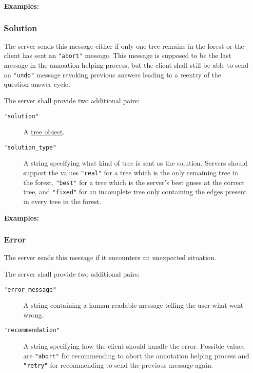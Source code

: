 \documentclass{scrartcl}
\newcommand{\jsstring}[1]{\texttt{\color{OrangeRed}"#1"}}
\newcommand{\Examples}{\noindent\textbf{Examples:}}
\begin{document}
\Examples



\subsubsection{Solution}
\label{ssub:Solution}

The server sends this message either if only one tree remains in the forest or the client has sent an \jsstring{abort} message.
This message is supposed to be the last message in the annoation helping process, but the client shall still be able to send an \jsstring{undo} message revoking previous answers leading to a reentry of the question-answer-cycle.

The server shall provide two additional pairs:
\begin{description}
    \item[\jsstring{solution}] A \hyperref[ssub:Tree object]{tree object}.
    \item[\jsstring{solution\_type}] A string specifying what kind of tree is sent as the solution.
        Servers should support the values \jsstring{real} for a tree which is the only remaining tree in the forest, \jsstring{best} for a tree which is the server’s best guess at the correct tree, and \jsstring{fixed} for an incomplete tree only containing the edges present in every tree in the forest.
\end{description}

\Examples



\subsubsection{Error}
\label{ssub:Error}

The server sends this message if it encounters an unexpected situation.

The server shall provide two additional pairs:
\begin{description}
    \item[\jsstring{error\_message}] A string containing a human-readable message telling the user what went wrong.
    \item[\jsstring{recommendation}] A string specifying how the client should handle the error.
        Possible values are \jsstring{abort} for recommending to abort the annotation helping process and \jsstring{retry} for recommending to send the previous message again.
\end{description}
\end{document}
